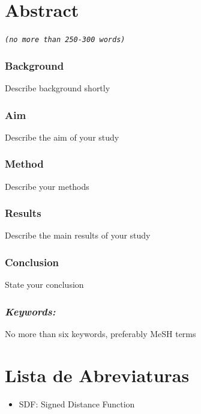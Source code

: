 \documentclass[11pt]{report}
\begin{document}

\chapter*{Abstract}

\thispagestyle{empty}

\textit{\texttt{(no more than 250-300 words)}}

\subsection*{Background}
Describe background shortly

\subsection*{Aim}
Describe the aim of your study

\subsection*{Method}
Describe your methods

\subsection*{Results}
Describe the main results of your study

\subsection*{Conclusion}
State your conclusion

\subsection*{\emph{Keywords:}} No more than six keywords, preferably MeSH terms


\tableofcontents
\setcounter{page}{1}
\thispagestyle{plain}



\chapter*{Lista de Abreviaturas}

\begin{itemize}
\item SDF: Signed Distance Function
\end{itemize}
\end{document}
